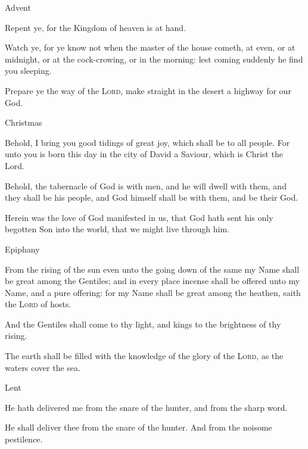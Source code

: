 \begin{multicols}{2}
\begin{inhead}
Advent
\end{inhead}\noindent
    Repent ye, for the Kingdom of heaven is at hand.
    \par
    Watch ye, for ye know not when the master of the house cometh, at even, or at midnight, or at the cock-crowing, or in the morning: lest coming suddenly he find you sleeping.
    \par
    Prepare ye the way of the \textsc{Lord}, make straight in the desert a highway for our God.

\begin{inhead}
Christmas
\end{inhead}\noindent
    Behold, I bring you good tidings of great joy, which shall be to all people. For unto you is born this day in the city of David a Saviour, which is Christ the Lord.
    \par
    Behold, the tabernacle of God is with men, and he will dwell with them, and they shall be his people, and God himself shall be with them, and be their God.
    \par
    Herein was the love of God manifested in us, that God hath sent his only begotten Son into the world, that we might live through him. 
    \par

\begin{inhead}
Epiphany
\end{inhead}\noindent
    From the rising of the sun even unto the going down of the same my Name shall be great among the Gentiles; and in every place incense shall be offered unto my Name, and a pure offering: for my Name shall be great among the heathen, saith the \textsc{Lord} of hosts.
    \par
    And the Gentiles shall come to thy light, and kings to the brightness of thy rising.\par
    The earth shall be filled with the knowledge of the glory of the \textsc{Lord}, as the waters cover the sea.
\begin{inhead}
Lent
\end{inhead}\noindent
    He hath delivered me from the snare of the hunter, and from the sharp word.\par
    He shall deliver thee from the snare of the hunter. And from the noisome pestilence.


\end{multicols}
